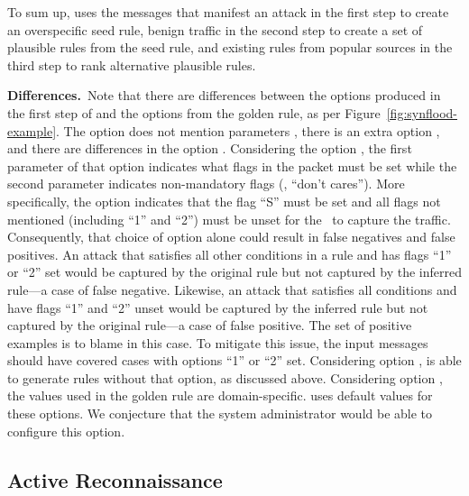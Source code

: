 \documentclass[sigconf,review, anonymous]{acmart}
\begin{document}
To sum up, \tname{} uses the messages that manifest an attack in the
first step to create an overspecific seed rule, benign traffic in the
second step to create a set of plausible rules from the seed rule, and
existing rules from popular sources in the third step to rank
alternative plausible rules.

\vspace{1ex}
\noindent
\textbf{Differences.}~Note that there are differences between the
options produced in the first step of \tname{} and the options from
the golden rule, as per Figure~\ref{fig:synflood-example}. The option
 does not mention parameters , there is an
extra option , and there are differences in the option
. Considering the option , the first
parameter of that option indicates what flags in the packet must be
set while the second parameter indicates non-mandatory flags (\ie{},
``don't cares''). More specifically, the option 
indicates that the flag ``S'' must be set and all flags not mentioned
(including ``1'' and ``2'') must be unset for the \nids\ to capture
the traffic. Consequently, that choice of option alone could result in
false negatives and false positives. An attack that satisfies all
other conditions in a rule and has flags ``1'' or ``2'' set would be
captured by the original rule but not captured by the inferred rule---a case of
false negative. Likewise, an attack that satisfies all conditions and
have flags ``1'' and ``2'' unset would be captured by the inferred
rule but not captured by the original rule---a case of false positive. The set of
positive examples is to blame in this case. To mitigate this issue,
the input messages should have covered cases with options ``1'' or
``2'' set. Considering option , \tname{} is able
to generate rules without that option, as discussed above. Considering
option , the values used in the golden rule are
domain-specific. \tname{} uses default values for these options. We
conjecture that the system administrator would be able to configure
this option.


\subsection{Active Reconnaissance}
\label{sec:active-recon}

\end{document}
